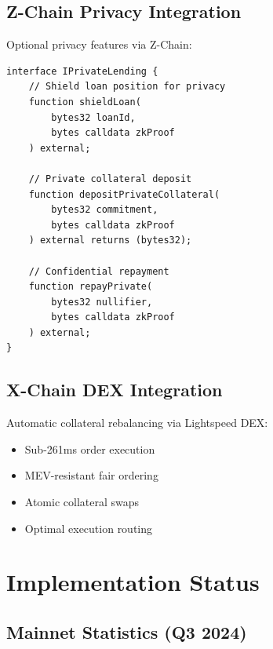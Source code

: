 \documentclass[11pt,a4paper]{article}
\begin{document}
\subsection{Z-Chain Privacy Integration}

Optional privacy features via Z-Chain:

\begin{lstlisting}[language=Solidity, basicstyle=\small\ttfamily]
interface IPrivateLending {
    // Shield loan position for privacy
    function shieldLoan(
        bytes32 loanId,
        bytes calldata zkProof
    ) external;
    
    // Private collateral deposit
    function depositPrivateCollateral(
        bytes32 commitment,
        bytes calldata zkProof
    ) external returns (bytes32);
    
    // Confidential repayment
    function repayPrivate(
        bytes32 nullifier,
        bytes calldata zkProof
    ) external;
}
\end{lstlisting}

\subsection{X-Chain DEX Integration}

Automatic collateral rebalancing via Lightspeed DEX:

\begin{itemize}
\item Sub-261ms order execution
\item MEV-resistant fair ordering
\item Atomic collateral swaps
\item Optimal execution routing
\end{itemize}

\section{Implementation Status}

\subsection{Mainnet Statistics (Q3 2024)}
\end{document}
